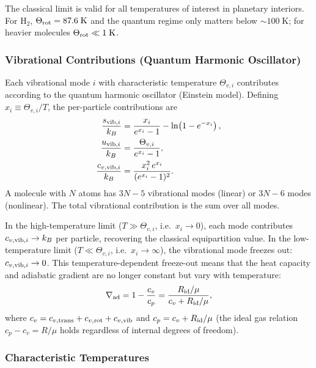 \documentclass[twocolumn]{aastex701}
\begin{document}
The classical limit is valid for all temperatures of interest in planetary interiors.
For H$_2$, $\Theta_{\rm rot} = 87.6\;\mathrm{K}$ and the quantum regime only matters below $\sim 100\;\mathrm{K}$; for heavier molecules $\Theta_{\rm rot} \ll 1\;\mathrm{K}$.

\subsubsection{Vibrational Contributions (Quantum Harmonic Oscillator)}\label{sec:vib}

Each vibrational mode $i$ with characteristic temperature $\Theta_{v,i}$ contributes according to the quantum harmonic oscillator (Einstein model).
Defining $x_i \equiv \Theta_{v,i}/T$, the per-particle contributions are
\begin{align}
    \frac{s_{{\rm vib},i}}{k_B} &= \frac{x_i}{e^{x_i}-1} - \ln\!\left(1 - e^{-x_i}\right), \label{eq:s_vib} \\
    \frac{u_{{\rm vib},i}}{k_B} &= \frac{\Theta_{v,i}}{e^{x_i}-1}, \label{eq:u_vib} \\
    \frac{c_{v,{\rm vib},i}}{k_B} &= \frac{x_i^2\, e^{x_i}}{(e^{x_i}-1)^2}. \label{eq:cv_vib}
\end{align}
A molecule with $N$ atoms has $3N-5$ vibrational modes (linear) or $3N-6$ modes (nonlinear).
The total vibrational contribution is the sum over all modes.

In the high-temperature limit ($T \gg \Theta_{v,i}$, i.e.\ $x_i \to 0$), each mode contributes $c_{v,{\rm vib},i} \to k_B$ per particle, recovering the classical equipartition value.
In the low-temperature limit ($T \ll \Theta_{v,i}$, i.e.\ $x_i \to \infty$), the vibrational mode freezes out: $c_{v,{\rm vib},i} \to 0$.
This temperature-dependent freeze-out means that the heat capacity and adiabatic gradient are no longer constant but vary with temperature:
\begin{equation}\label{eq:grad_ad_mol}
    \nabla_{\rm ad} = 1 - \frac{c_v}{c_p} = \frac{R_{\rm id}/\mu}{c_v + R_{\rm id}/\mu},
\end{equation}
where $c_v = c_{v,\rm trans} + c_{v,\rm rot} + c_{v,\rm vib}$ and $c_p = c_v + R_{\rm id}/\mu$ (the ideal gas relation $c_p - c_v = R/\mu$ holds regardless of internal degrees of freedom).

\subsubsection{Characteristic Temperatures}\label{sec:theta}
\end{document}
